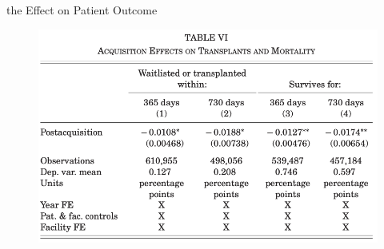\begin{frame}{the Effect on Patient Outcome}
    \begin{figure}
        \centering
        \includegraphics[width=0.8\linewidth]{tb6.png}
    \end{figure}
\end{frame}